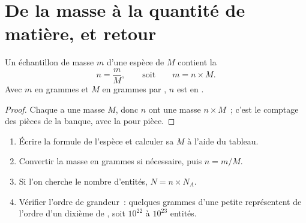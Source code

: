 \section{De la masse à la quantité de matière, et retour}

\begin{proposition}\label{prop:g10:the-mole:mass}
Un échantillon de masse $m$ d'une espèce de  $M$ contient la
\[
  n = \frac{m}{M}, \qquad\text{soit}\qquad m = n \times M .
\]
Avec $m$ en grammes et $M$ en grammes par , $n$ est en .
\end{proposition}

\begin{proof}
Chaque  a une masse $M$, donc $n$  ont une masse $n \times M$~;
c'est le comptage des pièces de la banque, avec la  pour pièce.
\end{proof}

\begin{method}\label{met:g10:the-mole:mass-to-number}
\begin{enumerate}
  \item Écrire la formule de l'espèce et calculer sa  $M$ à
        l'aide du tableau.
  \item Convertir la masse en grammes si nécessaire, puis $n = m / M$.
  \item Si l'on cherche le nombre d'entités, $N = n \times N_A$.
  \item Vérifier l'ordre de grandeur~: quelques grammes d'une petite
         représentent de l'ordre d'un dixième de , soit
        $10^{22}$ à $10^{23}$ entités.
\end{enumerate}
\end{method}

